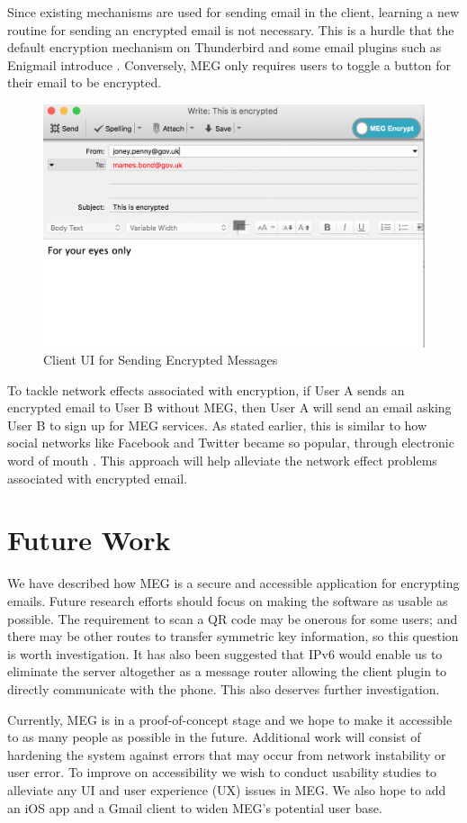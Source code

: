 \documentclass{sig-alternate-05-2015}
\begin{document}
\par Since existing mechanisms are used for sending email in the client, learning a new routine for sending an encrypted email is not necessary. This is a hurdle that the default encryption mechanism on Thunderbird and some email plugins such as Enigmail introduce \cite{enigmail-handbook}. Conversely, MEG only requires users to toggle a button for their email to be encrypted.
\begin{figure}[H]
    \centering
    \includegraphics[scale=.4]{encrypted-client-ui.png}
    \caption{Client UI for Sending Encrypted Messages}
    \label{fig:encrypted-ui}
\end{figure}
\par To tackle network effects associated with encryption, if User A sends an encrypted email to User B without MEG, then User A will send an email asking User B to sign up for MEG services. As stated earlier, this is similar to how social networks like Facebook and Twitter became so popular, through electronic word of mouth \cite{trusov2009effects}. This approach will help alleviate the network effect problems associated with encrypted email.
\section{Future Work}
\par We have described how MEG is a secure and accessible application for encrypting emails. Future research efforts should focus on making the software as usable as possible. The requirement to scan a QR code may be onerous for some users; and there may be other routes to transfer symmetric key information, so this question is worth investigation. It has also been suggested that IPv6 would enable us to eliminate the server altogether as a message router allowing the client plugin to directly communicate with the phone. This also deserves further investigation.
\par Currently, MEG is in a proof-of-concept stage and we hope to make it accessible to as many people as possible in the future. Additional work will consist of hardening the system against errors that may occur from network instability or user error. To improve on accessibility we wish to conduct usability studies to alleviate any UI and user experience (UX) issues in MEG. We also hope to add an iOS app and a Gmail client to widen MEG's potential user base.
\end{document}
